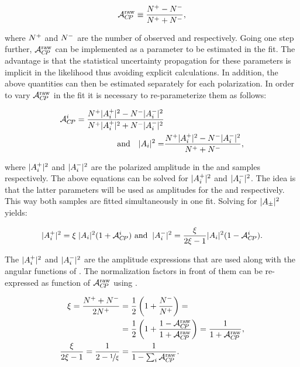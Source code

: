 \begin{equation}
\mathcal{A}_{C\!P}^{\text{raw}} \equiv \frac{{N^+} - {N^-}}{{N^+} + {N^-}},
\label{acp_mes}
\end{equation}

\noindent where ${N^+}$ and ${N^-}$ are the number of observed \BsbarJpsiKst and \BsJpsiKst respectively.
Going one step further, $\mathcal{A}_{C\!P}^{\text{raw}}$ can be implemented as a parameter to be estimated in the fit. The advantage
is that the statistical uncertainty propagation for these parameters is implicit in the likelihood thus avoiding
explicit calculations. In addition, the above quantities can then be estimated separately for each polarization.
In order to vary $\mathcal{A}_{C\!P}^{\text{raw}}$ in the fit it is necessary to re-parameterize them as follows:

\begin{align}
  \label{acp_param}
\mathcal{A}_{C\!P}^{i} = \frac{{N^+}|{A}_{i}^+|^2 - {N^-}|{A}_{i}^-|^2}{{N^+}|{A}_{i}^+|^2 + {N^-}|{A}_{i}^-|^2 } & \\
\text{and} \quad |{A}_{i}|^2 = &\frac{ {N^+} |{A}_{i}^+|^2 - {N^-}|{A}_{i}^-|^2}{{N^+} + {N^-}},
\end{align}

\noindent where $|{A}_{i}^+|^2$ and $|{A}_{i}^-|^2$ are the polarized amplitude in the \BsbarJpsiKst
and \BsJpsiKst samples respectively. The above equations can be solved for $|{A}_{i}^+|^2$ and $|{A}_{i}^-|^2$. The idea
is that the latter parameters will be used as amplitudes for the \BsbarJpsiKst and \BsJpsiKst \pdfs respectively.
This way both samples are fitted simultaneously in one fit. Solving  for $|{A}_{\pm}|^2$ yields:

\begin{equation}
|{A}_{i}^+|^2 = \xi \; |{A}_{i}|^2 (1+\mathcal{A}_{C\!P}^{i}) \,\, \text{and}\;\; |{A}_{i}^-|^2 = \frac{\xi}{2\xi-1} |{A}_{i}|^2 (1-\mathcal{A}_{C\!P}^{i}).
\label{acp_free}
\end{equation}

\noindent The $|{A}_{i}^+|^2$ and $|{A}_{i}^-|^2$ are the amplitude expressions that are used along with the angular functions of .
The normalization factors in front of them can be re-expressed as function of $\mathcal{A}_{C\!P}^{\text{raw}}$ using .

\begin{align}
\xi = \frac{{N^+}+{N^-}}{2{N^+}} &= \frac{1}{2}\left( 1 + \frac{N^{-}_{}}{N^{+}_{}}\right) = \nonumber \\
                                     &= \frac{1}{2}\left( 1 + \frac{1-\mathcal{A}_{C\!P}^{\text{raw}}}{1+\mathcal{A}_{C\!P}^{\text{raw}}}\right) =
                                        \frac{1}{1+\mathcal{A}_{C\!P}^{\text{raw}}},  \\
\frac{\xi}{2\xi-1} = \frac{1}{2-\nicefrac{1}{\xi}} &= \frac{1}{1-\sum_i\mathcal{A}_{C\!P}^{\text{raw}}}.
\label{amp_norms}
\end{align}

